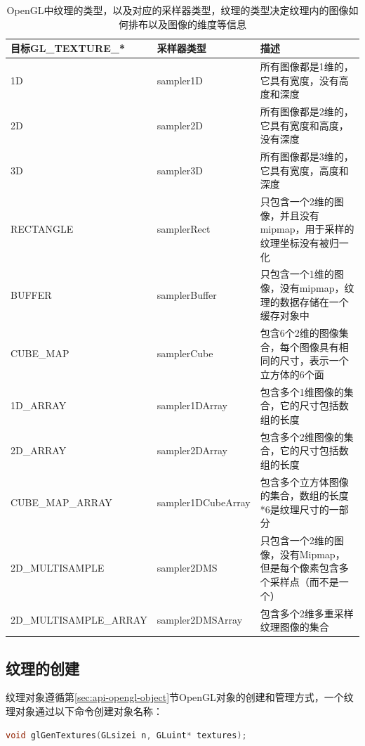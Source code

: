 \begin{table}
\begin{fullwidth}
\caption{OpenGL中纹理的类型，以及对应的采样器类型，纹理的类型决定纹理内的图像如何排布以及图像的维度等信息}
\label{t:api-texture-type}
\centering
\begin{tabular}{>{\footnotesize}p{0.27\thewidth}|>{\small}p{0.19\thewidth}|>{\small}p{0.52\thewidth}}
\hline 
   目标GL\_TEXTURE\_* & 采样器类型 & 描述 \\
    \hline  
  1D  &sampler1D &所有图像都是1维的，它具有宽度，没有高度和深度\\
  2D  &sampler2D &所有图像都是2维的，它具有宽度和高度，没有深度\\
  3D  &sampler3D &所有图像都是3维的，它具有宽度，高度和深度\\
  RECTANGLE  &samplerRect &只包含一个2维的图像，并且没有mipmap，用于采样的纹理坐标没有被归一化\\
  BUFFER  &samplerBuffer & 只包含一个1维的图像，没有mipmap，纹理的数据存储在一个缓存对象中\\
  CUBE\_MAP &samplerCube& 包含6个2维的图像集合，每个图像具有相同的尺寸，表示一个立方体的6个面\\
  1D\_ARRAY &sampler1DArray& 包含多个1维图像的集合，它的尺寸包括数组的长度\\
  2D\_ARRAY &sampler2DArray& 包含多个2维图像的集合，它的尺寸包括数组的长度\\
  CUBE\_MAP\_ARRAY &sampler1DCubeArray& 包含多个立方体图像的集合，数组的长度*6是纹理尺寸的一部分\\
  2D\_MULTISAMPLE &sampler2DMS& 只包含一个2维的图像，没有Mipmap，但是每个像素包含多个采样点（而不是一个）\\
  2D\_MULTISAMPLE\_ARRAY &sampler2DMSArray&包含多个2维多重采样纹理图像的集合\\

 \hline 
\end{tabular}
\end{fullwidth}
\end{table}




\subsection{纹理的创建}\label{sec:api-texture-create}
纹理对象遵循第\ref{sec:api-opengl-object}节OpenGL对象的创建和管理方式，一个纹理对象通过以下命令创建对象名称：

\begin{lstlisting}[language=C++]
void glGenTextures(GLsizei n, GLuint* textures);
\end{lstlisting}

